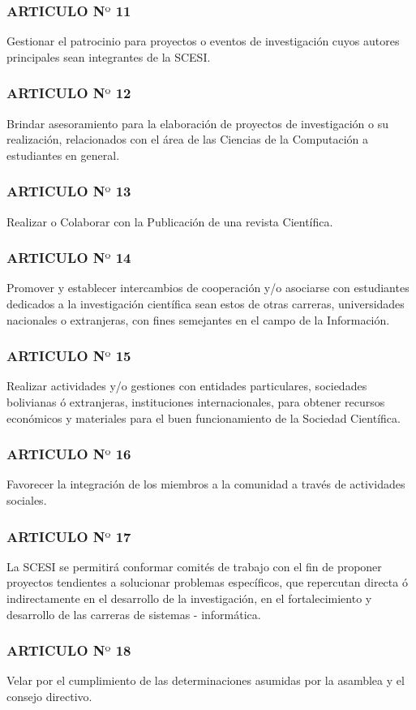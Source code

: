 \documentclass[letterpaper,11pt]{book}
\begin{document}
\subsubsection*{ARTICULO N$º$ 11}
Gestionar el patrocinio para proyectos o eventos de investigación cuyos autores principales sean integrantes de la SCESI. 
\subsubsection*{ARTICULO N$º$ 12}
Brindar asesoramiento para la elaboración de proyectos de investigación o su realización, relacionados con el área de las Ciencias de la Computación a estudiantes en general.
\subsubsection*{ARTICULO N$º$ 13}
Realizar o Colaborar con la Publicación de una revista Científica.
\subsubsection*{ARTICULO N$º$ 14}
Promover y establecer intercambios de cooperación y/o asociarse con estudiantes dedicados a la investigación científica sean estos de otras carreras, universidades nacionales o extranjeras, con fines semejantes en el campo de la Información.
\subsubsection*{ARTICULO N$º$ 15}
Realizar actividades y/o gestiones con entidades particulares, sociedades bolivianas ó extranjeras, instituciones internacionales, para obtener recursos económicos y materiales para el buen funcionamiento de la Sociedad Científica.
\subsubsection*{ARTICULO N$º$ 16}
Favorecer la integración de los miembros a la comunidad a través de actividades sociales.
\subsubsection*{ARTICULO N$º$ 17}
La SCESI se permitirá conformar comités de trabajo con el fin de proponer proyectos tendientes a solucionar problemas específicos, que repercutan directa ó indirectamente en el desarrollo de la investigación, en el fortalecimiento y desarrollo de las carreras de sistemas - informática.
\subsubsection*{ARTICULO N$º$ 18}
Velar por el cumplimiento de las determinaciones asumidas por la asamblea y el consejo directivo.
\newpage
\end{document}
